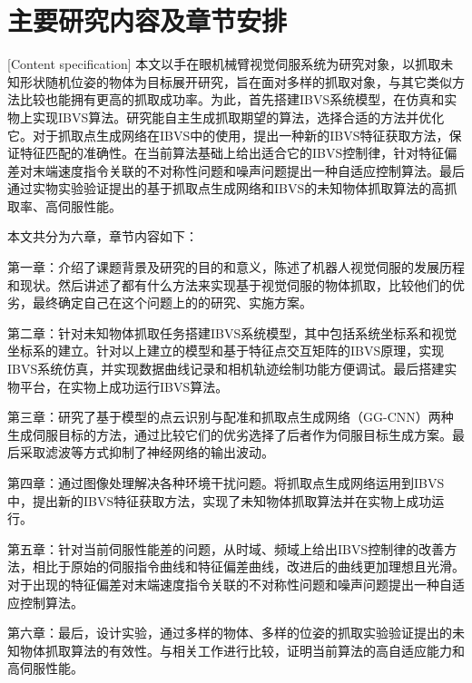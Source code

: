 \documentclass[fontset=fandol,type=bachelor,campus=harbin]{hithesisbook}
\begin{document}
\section{主要研究内容及章节安排}[Content specification]
本文以手在眼机械臂视觉伺服系统为研究对象，以抓取未知形状随机位姿的物体为目标展开研究，旨在面对多样的抓取对象，与其它类似方法比较也能拥有更高的抓取成功率。为此，首先搭建IBVS系统模型，在仿真和实物上实现IBVS算法。研究能自主生成抓取期望的算法，选择合适的方法并优化它。对于抓取点生成网络在IBVS中的使用，提出一种新的IBVS特征获取方法，保证特征匹配的准确性。在当前算法基础上给出适合它的IBVS控制律，针对特征偏差对末端速度指令关联的不对称性问题和噪声问题提出一种自适应控制算法。最后通过实物实验验证提出的基于抓取点生成网络和IBVS的未知物体抓取算法的高抓取率、高伺服性能。

本文共分为六章，章节内容如下：

 
第一章：介绍了课题背景及研究的目的和意义，陈述了机器人视觉伺服的发展历程和现状。然后讲述了都有什么方法来实现基于视觉伺服的物体抓取，比较他们的优劣，最终确定自己在这个问题上的的研究、实施方案。 

 
第二章：针对未知物体抓取任务搭建IBVS系统模型，其中包括系统坐标系和视觉坐标系的建立。针对以上建立的模型和基于特征点交互矩阵的IBVS原理，实现IBVS系统仿真，并实现数据曲线记录和相机轨迹绘制功能方便调试。最后搭建实物平台，在实物上成功运行IBVS算法。


第三章：研究了基于模型的点云识别与配准和抓取点生成网络（GG-CNN）两种生成伺服目标的方法，通过比较它们的优劣选择了后者作为伺服目标生成方案。最后采取滤波等方式抑制了神经网络的输出波动。


第四章：通过图像处理解决各种环境干扰问题。将抓取点生成网络运用到IBVS中，提出新的IBVS特征获取方法，实现了未知物体抓取算法并在实物上成功运行。


第五章：针对当前伺服性能差的问题，从时域、频域上给出IBVS控制律的改善方法，相比于原始的伺服指令曲线和特征偏差曲线，改进后的曲线更加理想且光滑。对于出现的特征偏差对末端速度指令关联的不对称性问题和噪声问题提出一种自适应控制算法。


第六章：最后，设计实验，通过多样的物体、多样的位姿的抓取实验验证提出的未知物体抓取算法的有效性。与相关工作进行比较，证明当前算法的高自适应能力和高伺服性能。
\end{document}
